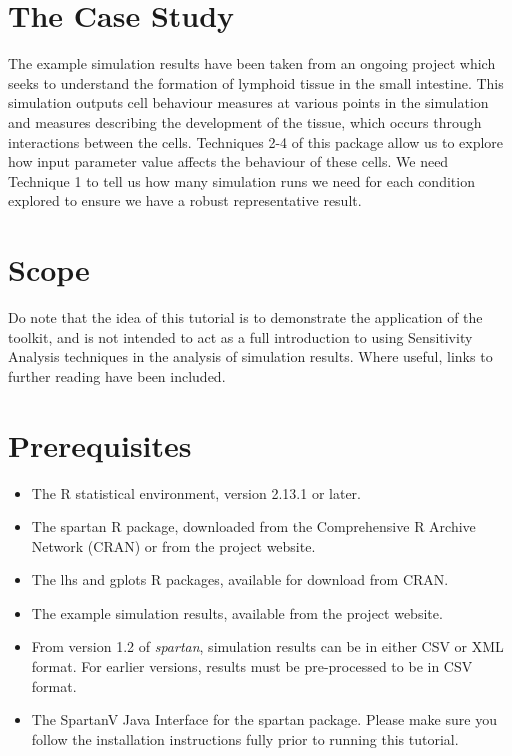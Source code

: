 \documentclass[a4paper,11pt]{article}
\begin{document}
\section{The Case Study}
\noindent The example simulation results have been taken from an ongoing project which seeks to understand the formation of lymphoid tissue in the small intestine. This simulation outputs cell behaviour measures at various points in the simulation and measures describing the development of the tissue, which occurs through interactions between the cells. Techniques 2-4 of this package allow us to explore how input parameter value affects the behaviour of these cells. We need Technique 1 to tell us how many simulation runs we need for each condition explored to ensure we have a robust representative result.

\section{Scope}
\noindent Do note that the idea of this tutorial is to demonstrate the application of the toolkit, and is not intended to act as a full introduction to using Sensitivity Analysis techniques in the analysis of simulation results. Where useful, links to further reading have been included.

\section{Prerequisites}
\begin{itemize}
\item The R statistical environment, version 2.13.1 or later.
\item The spartan R package, downloaded from the Comprehensive R Archive Network (CRAN) or from the project website.
\item The lhs and gplots R packages, available for download from CRAN.
\item The example simulation results, available from the project website.
\item From version 1.2 of \textit{spartan}, simulation results can be in either CSV or XML format. For earlier versions, results must be pre-processed to be in CSV format.
\item The SpartanV Java Interface for the spartan package. Please make sure you follow the installation instructions fully prior to running this tutorial.
\end{itemize}
\end{document}
